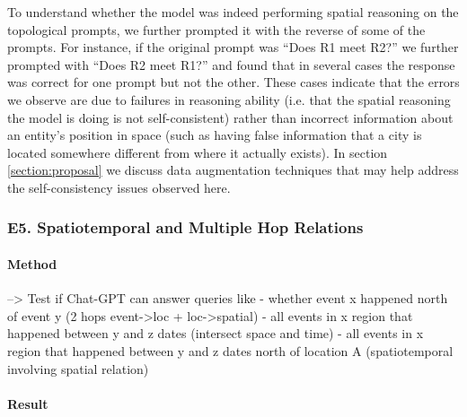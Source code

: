 To understand whether the model was indeed performing spatial reasoning on the topological prompts, we further prompted it with the reverse of some of the prompts.
For instance, if the original prompt was ``Does R1 meet R2?'' we further prompted with ``Does R2 meet R1?'' and found that in several cases the response was correct for one prompt but not the other.
These cases indicate that the errors we observe are due to failures in reasoning ability (i.e. that the spatial reasoning the model is doing is not self-consistent) rather than incorrect information about an entity's position in space (such as having false information that a city is located somewhere different from where it actually exists).
In section \ref{section:proposal} we discuss data augmentation techniques that may help address the self-consistency issues observed here.



\subsubsection{E5. Spatiotemporal and Multiple Hop Relations}
\paragraph{Method}
--> Test if Chat-GPT can answer queries like
- whether event x happened north of event y (2 hops event->loc + loc->spatial)
- all events in x region that happened between y and z dates (intersect space and time)
- all events in x region that happened between y and z dates north of location A (spatiotemporal involving spatial relation) 

\paragraph{Result}








        

